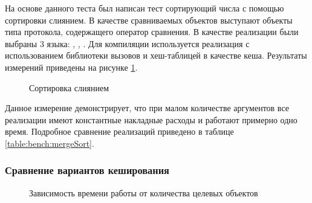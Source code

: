 На основе данного теста был написан тест сортирующий числа с помощью сортировки слиянием\cite{merge_sort}. В качестве сравниваемых объектов выступают объекты типа протокола, содержащего оператор сравнения. В качестве реализации были выбраны 3  языка: , , . Для компиляции  используется реализация с использованием библиотеки вызовов и хеш-таблицей в качестве кеша. Результаты измерений приведены на рисунке \ref{plot:bench:mergeSort}.

\begin{figure}
\caption{\label{plot:bench:mergeSort} Сортировка слиянием}
\end{figure}

Данное измерение демонстрирует, что при малом количестве аргументов все реализации имеют константные накладные расходы и работают примерно одно время. Подробное сравнение реализаций приведено в таблице \ref{table:bench:mergeSort}.

\subsubsection{Сравнение вариантов кеширования}


\begin{figure}
\caption{\label{plot:bench:cachetype} Зависимость времени работы от количества целевых объектов}
\end{figure}

